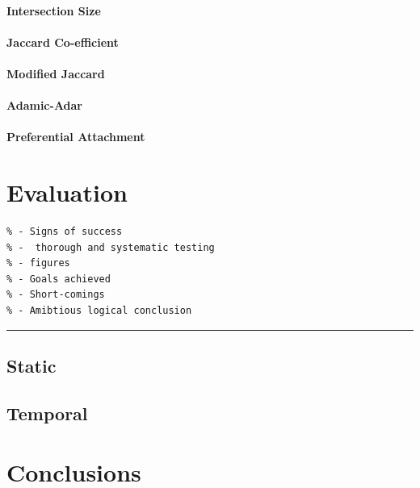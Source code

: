 \documentclass[a4paper,12pt,twoside,notitlepage]{report}
\newcommand{\rulewidth}{300pt}
\newcommand{\halfrule}{
  \begin{center}
    {\rule{\rulewidth}{0.5pt}}
  \end{center}}
\begin{document}
\subsubsection{Intersection Size}

\subsubsection{Jaccard Co-efficient}

\subsubsection{Modified Jaccard}

\subsubsection{Adamic-Adar}

\subsubsection{Preferential Attachment}

\chapter{Evaluation}

\begin{verbatim}
% - Signs of success
% -  thorough and systematic testing
% - figures
% - Goals achieved
% - Short-comings
% - Amibtious logical conclusion 
\end{verbatim}

\halfrule

\section{Static}

\section{Temporal}

\chapter{Conclusions}
\end{document}
